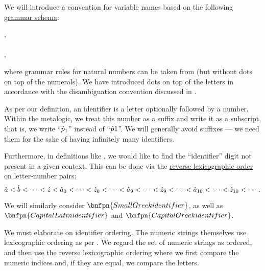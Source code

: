 \begin{definition}\label{def:variable_identifier}\mimprovised
  We will introduce a convention for variable names based on the following \hyperref[def:formal_grammar/schema]{grammar schema}:
  \begin{bnf*}
         { \bnfor {} \bnfor \cdots \bnfor {} \bnfor {}}, \\
     { \bnfor} \\
    , \\
  \end{bnf*}
  where grammar rules for natural numbers can be taken from  (but without dots on top of the numerals). We have introduced dots on top of the letters in accordance with the disambiguation convention discussed in .

  As per our definition, an identifier is a letter optionally followed by a number. Within the metalogic, we treat this number as a suffix and write it as a subscript, that is, we write \enquote{\( {\dot{p}}_1 \)} instead of \enquote{\( {\dot{p}}1 \)}. We will generally avoid suffixes --- we need them for the sake of having infinitely many identifiers.

  Furthermore, in definitions like , we would like to find the \enquote{identifier} digit not present in a given context. This can be done via the \hyperref[thm:def:well_ordered_set/lexicographic]{reverse lexicographic order} on letter-number pairs:
  \begin{equation*}
    \dot{a} < \dot{b} < \cdots < \dot{z} < \dot{a}_0 < \cdots < \dot{z}_0 < \cdots < \dot{a}_9 < \cdots < \dot{z}_9 < \cdots < \dot{a}_{10} < \cdots < \dot{z}_{10} < \cdots.
  \end{equation*}

  We will similarly consider \( \bnfpn{Small Greek identifier} \), as well as \( \bnfpn{Capital Latin identifier} \) and \( \bnfpn{Capital Greek identifier} \).
\end{definition}
\begin{comments}
  \item We must elaborate on identifier ordering. The numeric strings themselves use lexicographic ordering as per . We regard the set of numeric strings as ordered, and then use the reverse lexicographic ordering where we first compare the numeric indices and, if they are equal, we compare the letters.
\end{comments}

